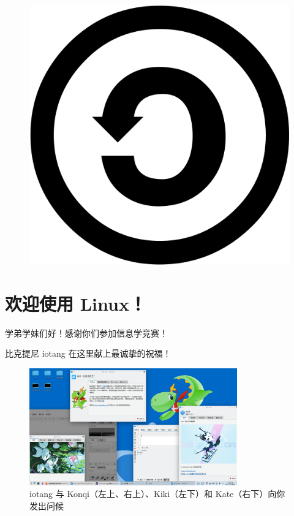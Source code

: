 \documentclass[UTF-8]{ctexart}
\begin{document}
\begin{center}
\begin{figure}[H]
\begin{minipage}{0.15\textwidth}
				\caption*{}
			\end{minipage}
			\begin{minipage}{0.15\textwidth}
				\centering
				\includegraphics[width=\textwidth]{fig/sa.xlarge.png}
				\caption*{}
			\end{minipage}
		\end{figure}
		
	\end{center}
	\vspace*{\fill}
	
	\newpage
	
	\tableofcontents

	\newpage

	\section{欢迎使用 Linux！}
	
		学弟学妹们好！感谢你们参加信息学竞赛！
		
		比克提尼 iotang 在这里献上最诚挚的祝福！
			
		\begin{figure}[H]
			\centering
			\includegraphics[width=0.8\textwidth]{fig/iotangsdesktop.png}
			\caption*{iotang 与 Konqi（左上、右上）、Kiki（左下）和 Kate（右下）向你发出问候}
		\end{figure}
	
\end{document}
